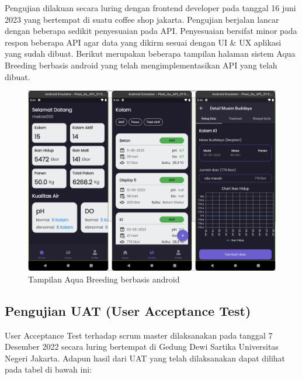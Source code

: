Pengujian dilakuan secara luring dengan frontend developer pada tanggal 16 juni 2023 yang bertempat di suatu coffee shop jakarta. Pengujian berjalan lancar dengan beberapa sedikit penyesuaian pada API. Penyesuaian bersifat minor pada respon beberapa API agar data yang dikirm sesuai dengan UI \& UX aplikasi yang sudah dibuat. Berikut merupakan beberapa tampilan halaman sistem Aqua Breeding berbasis android yang telah mengimplementasikan API yang telah dibuat.

\begin{figure}[H]
	\centering
	\includegraphics[width=1\textwidth]{gambar/prototipe_aqua_breeding}
	\caption{Tampilan Aqua Breeding berbasis android}
	\label{fig:aqua_breeding}
\end{figure}


\subsection {Pengujian UAT (User Acceptance Test)}
User Acceptance Test terhadap scrum master dilaksanakan pada tanggal 7 Desember 2022 secara luring bertempat di Gedung Dewi Sartika Universitas Negeri Jakarta. Adapun hasil dari UAT yang telah dilaksanakan dapat dilihat pada tabel di bawah ini:


